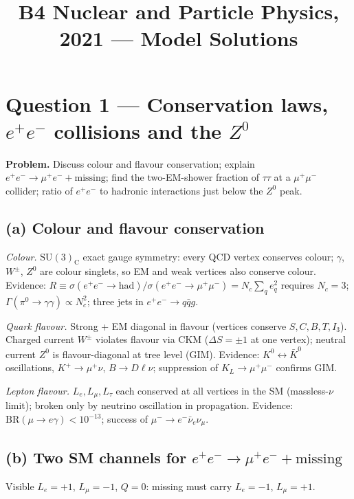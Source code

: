 \documentclass[11pt]{article}
\title{B4 Nuclear and Particle Physics, 2021 --- Model Solutions}
\author{}
\date{}
\begin{document}
\maketitle

\section*{Question 1 --- Conservation laws, $e^{+}e^{-}$ collisions and the $Z^{0}$}

\textbf{Problem.} Discuss colour and flavour conservation; explain $e^{+}e^{-}\to\mu^{+}e^{-}+\text{missing}$; find the two-EM-shower fraction of $\tau\tau$ at a $\mu^{+}\mu^{-}$ collider; ratio of $e^{+}e^{-}$ to hadronic interactions just below the $Z^{0}$ peak.

\subsection*{(a) Colour and flavour conservation}

\emph{Colour.} $\mathrm{SU(3)_{C}}$ exact gauge symmetry: every QCD vertex conserves colour; $\gamma$, $W^{\pm}$, $Z^{0}$ are colour singlets, so EM and weak vertices also conserve colour. Evidence: $R\equiv\sigma(e^{+}e^{-}\to\text{had})/\sigma(e^{+}e^{-}\to\mu^{+}\mu^{-})=N_{c}\sum_{q}e_{q}^{2}$ requires $N_{c}=3$; $\Gamma(\pi^{0}\to\gamma\gamma)\propto N_{c}^{2}$; three jets in $e^{+}e^{-}\to q\bar q g$.

\emph{Quark flavour.} Strong + EM diagonal in flavour (vertices conserve $S,C,B,T,I_{3}$). Charged current $W^{\pm}$ violates flavour via CKM ($\Delta S=\pm 1$ at one vertex); neutral current $Z^{0}$ is flavour-diagonal at tree level (GIM). Evidence: $K^{0}\!\leftrightarrow\!\bar K^{0}$ oscillations, $K^{+}\to\mu^{+}\nu$, $B\to D\ell\nu$; suppression of $K_{L}\to\mu^{+}\mu^{-}$ confirms GIM.

\emph{Lepton flavour.} $L_{e},L_{\mu},L_{\tau}$ each conserved at all vertices in the SM (massless-$\nu$ limit); broken only by neutrino oscillation in propagation. Evidence: $\mathrm{BR}(\mu\to e\gamma)<10^{-13}$; success of $\mu^{-}\to e^{-}\bar\nu_{e}\nu_{\mu}$.

\subsection*{(b) Two SM channels for $e^{+}e^{-}\to\mu^{+}e^{-}+\text{missing}$}

Visible $L_{e}=+1$, $L_{\mu}=-1$, $Q=0$: missing must carry $L_{e}=-1$, $L_{\mu}=+1$.
\end{document}
